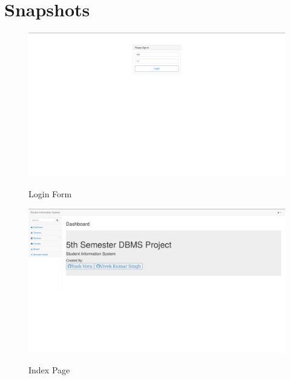 \chapter{Snapshots}


\begin{figure}[H]
\centering
\caption{Login Form}
\includegraphics[width=\textwidth,height=\textheight,keepaspectratio]{./snaps/1.png}
\\[0.2in]

\end{figure}

\begin{figure}[H]
\centering
\caption{Index Page}
\includegraphics[width=\textwidth,height=\textheight,keepaspectratio]{./snaps/2.png}
\\[0.2in]

\end{figure}

